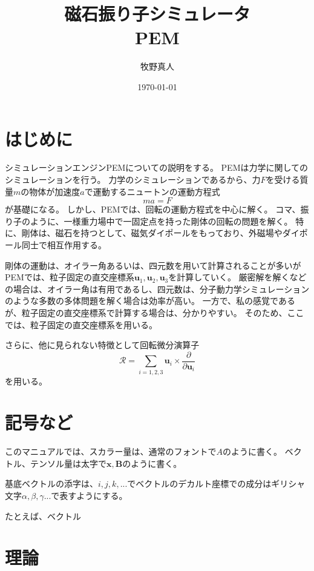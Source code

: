 \documentclass[a4paper,11pt]{jbook}
\title{磁石振り子シミュレータ\\PEM}
\author{牧野真人}
\date{\today}
\def\vecR {\bm {\mathcal {R} } }
\begin{document}
\maketitle
\tableofcontents 
\chapter{はじめに}
シミュレーションエンジンPEMについての説明をする。
PEMは力学に関してのシミュレーションを行う。
力学のシミュレーションであるから、力$F$を受ける質量$m$の物体が加速度$a$で運動するニュートンの運動方程式
\begin{equation}
ma=F
\end{equation}
が基礎になる。
しかし、PEMでは、回転の運動方程式を中心に解く。
コマ、振り子のように、一様重力場中で一固定点を持った剛体の回転の問題を解く。
特に、剛体は、磁石を持つとして、磁気ダイポールをもっており、外磁場やダイポール同士で相互作用する。

剛体の運動は、オイラー角あるいは、四元数を用いて計算されることが多いがPEMでは、粒子固定の直交座標系$\bm{u}_1,\bm{u}_2,\bm{u}_3$を計算していく。
厳密解を解くなどの場合は、オイラー角は有用であるし、四元数は、分子動力学シミュレーションのような多数の多体問題を解く場合は効率が高い。
一方で、私の感覚であるが、粒子固定の直交座標系で計算する場合は、分かりやすい。
そのため、ここでは、粒子固定の直交座標系を用いる。

さらに、他に見られない特徴として回転微分演算子
\begin{equation}
\vecR =\sum_{i=1,2,3}\bm{u}_i\times\frac{\partial}{\partial \bm{u}_i}
\end{equation}
を用いる。
\chapter{記号など}
このマニュアルでは、スカラー量は、通常のフォントで$A$のように書く。
ベクトル、テンソル量は太字で$\bm{x},\bm{B}$のように書く。

基底ベクトルの添字は、$i,j,k,...$でベクトルのデカルト座標での成分はギリシャ文字$\alpha, \beta,\gamma ...$で表すようにする。

たとえば、ベクトル
\chapter{理論}
\end{document}
